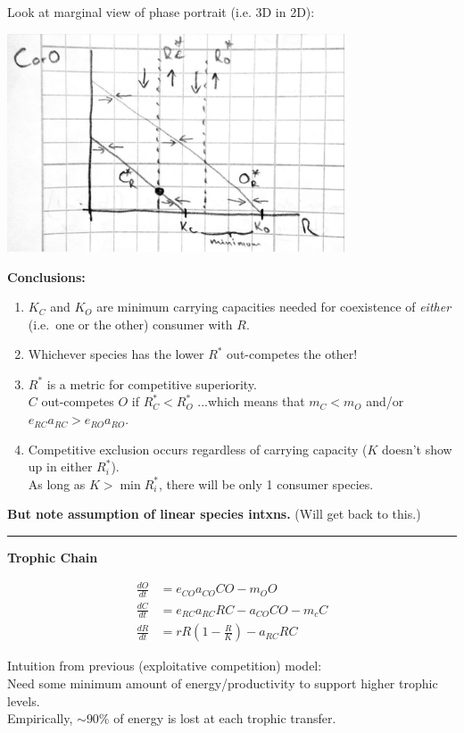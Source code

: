 \documentclass{article}
\newcommand{\ind}{\-\hspace{1cm}}
\begin{document}
Look at marginal view of phase portrait (i.e. 3D in 2D):
\begin{center}
 	\includegraphics[width=10cm]{figs/LVcomp.pdf}
\end{center}

\textbf{Conclusions:}
\begin{enumerate}
\item $K_C$ and $K_O$ are minimum carrying capacities needed for coexistence of \textit{either} (i.e.~one or the other) consumer with $R$.
\item Whichever species has the lower $R^*$ out-competes the other!
\item $R^*$ is a metric for competitive superiority.\\
\ind $C$ out-competes $O$ if $R_C^* < R_O^*$ ...which means that $m_C < m_O$ and/or $e_{RC} a_{RC} > e_{RO} a_{RO}$.

\item Competitive exclusion occurs regardless of carrying capacity ($K$ doesn't show up in either $R_i^*$).\\
\ind As long as $K>\min R_i^*$, there will be only 1 consumer species.\\
\end{enumerate}
\textbf{But note assumption of linear species intxns.}  (Will get back to this.)

\rule[0.5ex]{\linewidth}{1pt}
\pagebreak
\begin{center}	\textbf{Trophic Chain} \end{center}
\begin{align*}
		\frac{dO}{dt}&=e_{CO}a_{CO}C O - m_O O\\
		\frac{dC}{dt}&=e_{RC}a_{RC}R C -a_{CO}CO- m_c C\\
		\frac{dR}{dt}&=r R \left(1-\frac{R}{K}\right) - a_{RC}RC
\end{align*}

Intuition from previous (exploitative competition) model:\\
\ind Need some minimum amount of energy/productivity to support higher trophic levels.\\
\ind Empirically, $\sim$90\% of energy is lost at each trophic transfer.\\
\end{document}
